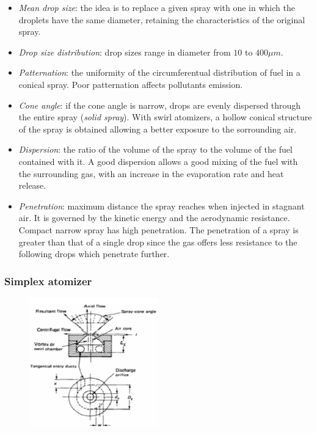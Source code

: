 \documentclass[12pt]{article}
\begin{document}
\begin{itemize}
    \item \textit{Mean drop size}: the idea is to replace a given spray with one in which the droplets have the same diameter, retaining the characteristics of the original spray.
    \item \textit{Drop size distribution}: drop sizes range in diameter from $10$ to $400 \mu m$.
    \item  \textit{Patternation}: the uniformity of the circumferentual distribution of fuel in a conical spray. Poor patternation affects pollutants emission.
    \item \textit{Cone angle}: if the cone angle is narrow, drops are evenly dispersed through the entire spray (\textit{solid spray}). With swirl atomizers, a hollow conical structure of the spray is obtained allowing a better exposure to the sorrounding air.
    \item \textit{Dispersion}: the ratio of the volume of the spray to the volume of the fuel contained with it. A good dispersion allows a good mixing of the fuel with the surrounding gas, with an increase in the evaporation rate and heat release.
    \item \textit{Penetration}: maximum distance the spray reaches when injected in stagnant air. It is governed by the kinetic energy and the aerodynamic resistance. Compact narrow spray has high penetration. The penetration of a spray is greater than that of a single drop since the gas offers less resistance to the following drops which penetrate further.
\end{itemize}

\subsubsection{Simplex atomizer}

\begin{figure}[h!]
\centering
\includegraphics[width=0.5\textwidth]{figures/simplex.png}
\end{figure}
\end{document}
